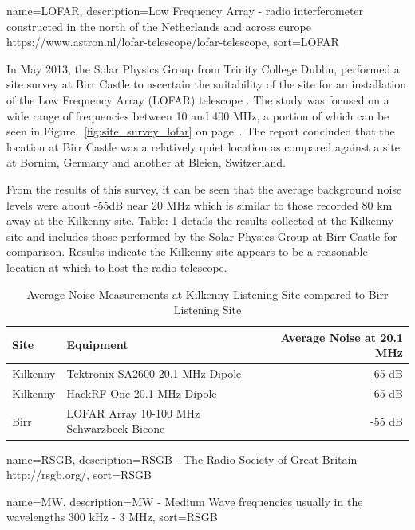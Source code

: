 {
  name={LOFAR},
  description={Low Frequency Array - radio interferometer constructed in the north of the Netherlands and across europe https://www.astron.nl/lofar-telescope/lofar-telescope},
  sort=LOFAR
}

In May 2013, the Solar Physics Group from Trinity College Dublin, performed a site survey at Birr Castle to ascertain the suitability of the site for an installation of the Low Frequency Array (\gls{LOFAR}) telescope \citep{craf-13}. The study was focused on a wide range of frequencies between 10 and 400 MHz, a portion of which can be seen in Figure.~\ref{fig:site_survey_lofar} on page~\pageref{fig:site_survey_lofar}. The report concluded that the location at Birr Castle was a relatively quiet location as compared against a site at Bornim, Germany and another at Bleien, Switzerland. 

From the results of this survey, it can be seen that the average background noise levels were about -55dB near 20 MHz which is similar to those recorded 80 km away at the Kilkenny site. Table: \ref{tab:site_survey} details the results collected at the Kilkenny site and includes those performed by the Solar Physics Group at Birr Castle for comparison. Results indicate the Kilkenny site appears to be a reasonable location at which to host the radio telescope.


%
\begin{table}
  \centering
  \begin{tabular}{p{2cm} l r}
    \toprule
    Site & Equipment & Average Noise at 20.1 MHz \\ \midrule
    Kilkenny & Tektronix SA2600 20.1 MHz Dipole & -65 dB  \\
    Kilkenny & HackRF One 20.1 MHz Dipole & -65 dB \\
    Birr & LOFAR Array 10-100 MHz Schwarzbeck Bicone & -55 dB \\
    \bottomrule
  \end{tabular}
  \caption{Average Noise Measurements at Kilkenny Listening Site compared to Birr Listening Site \citep{craf-13}}
  \label{tab:site_survey}
\end{table}
%

{
  name={RSGB},
  description={RSGB - The Radio Society of Great Britain http://rsgb.org/},
  sort=RSGB
}

{
  name={MW},
  description={MW - Medium Wave frequencies usually in the wavelengths 300 kHz - 3 MHz},
  sort=RSGB
}


